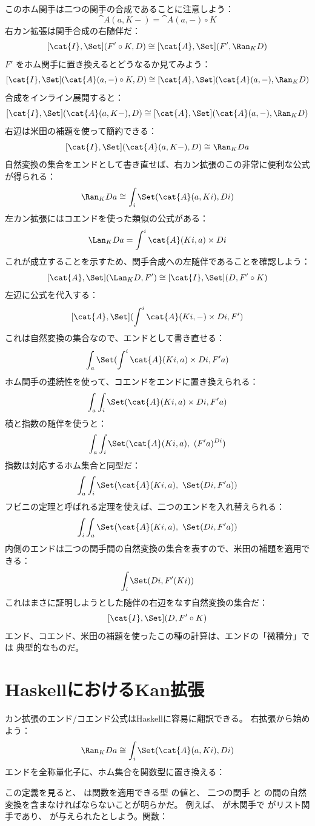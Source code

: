 \noindent
このホム関手は二つの関手の合成であることに注意しよう：
\[\cat{A}(a, K -) = \cat{A}(a, -) \circ K\]
右カン拡張は関手合成の右随伴だ：
\[[\cat{I}, \Set](F' \circ K, D) \cong [\cat{A}, \Set](F', \Ran_{K}D)\]
$F'$ をホム関手に置き換えるとどうなるか見てみよう：
\[[\cat{I}, \Set](\cat{A}(a, -) \circ K, D) \cong [\cat{A}, \Set](\cat{A}(a, -), \Ran_{K}D)\]
合成をインライン展開すると：
\[[\cat{I}, \Set](\cat{A}(a, K -), D) \cong [\cat{A}, \Set](\cat{A}(a, -), \Ran_{K}D)\]
右辺は米田の補題を使って簡約できる：
\[[\cat{I}, \Set](\cat{A}(a, K -), D) \cong \Ran_{K}D a\]
自然変換の集合をエンドとして書き直せば、右カン拡張のこの非常に便利な公式が得られる：
\[\Ran_{K}D a \cong \int_i \Set(\cat{A}(a, K i), D i)\]
左カン拡張にはコエンドを使った類似の公式がある：
\[\Lan_{K}D a = \int^i \cat{A}(K i, a)\times{}D i\]
これが成立することを示すため、関手合成への左随伴であることを確認しよう：
\[[\cat{A}, \Set](\Lan_{K}D, F') \cong [\cat{I}, \Set](D, F' \circ K)\]
左辺に公式を代入する：
\[[\cat{A}, \Set](\int^i \cat{A}(K i, -)\times{}D i, F')\]
これは自然変換の集合なので、エンドとして書き直せる：
\[\int_a \Set(\int^i \cat{A}(K i, a)\times{}D i, F' a)\]
ホム関手の連続性を使って、コエンドをエンドに置き換えられる：
\[\int_a \int_i \Set(\cat{A}(K i, a)\times{}D i, F' a)\]
積と指数の随伴を使うと：
\[\int_a \int_i \Set(\cat{A}(K i, a),\ (F' a)^{D i})\]
指数は対応するホム集合と同型だ：
\[\int_a \int_i \Set(\cat{A}(K i, a),\ \Set(D i, F' a))\]
フビニの定理と呼ばれる定理を使えば、二つのエンドを入れ替えられる：
\[\int_i \int_a \Set(\cat{A}(K i, a),\ \Set(D i, F' a))\]
内側のエンドは二つの関手間の自然変換の集合を表すので、米田の補題を適用できる：
\[\int_i \Set(D i, F' (K i))\]
これはまさに証明しようとした随伴の右辺をなす自然変換の集合だ：
\[[\cat{I}, \Set](D, F' \circ K)\]
エンド、コエンド、米田の補題を使ったこの種の計算は、エンドの「微積分」では
典型的なものだ。

\section{HaskellにおけるKan拡張}

カン拡張のエンド/コエンド公式はHaskellに容易に翻訳できる。
右拡張から始めよう：
\[\Ran_{K}D a \cong \int_i \Set(\cat{A}(a, K i), D i)\]
エンドを全称量化子に、ホム集合を関数型に置き換える：

この定義を見ると、 は関数を適用できる型  の値と、
二つの関手  と  の間の自然変換を含まなければならないことが明らかだ。
例えば、 が木関手で  がリスト関手であり、
 が与えられたとしよう。関数：

